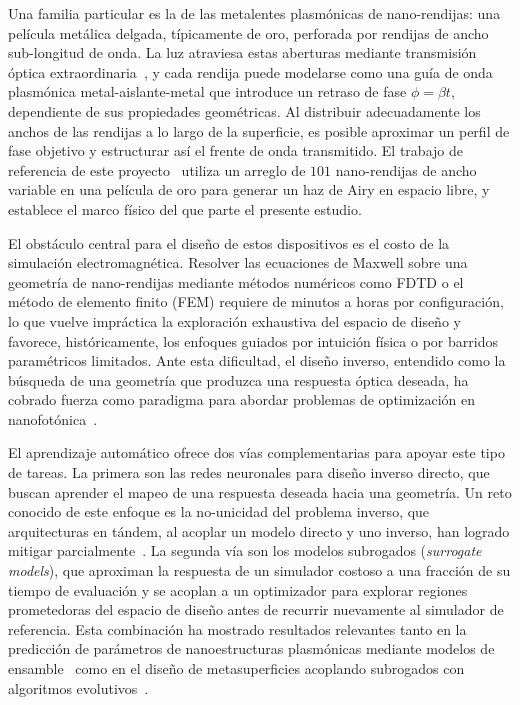 Una familia particular es la de las metalentes plasmónicas de nano-rendijas: una película metálica delgada, típicamente de oro, perforada por rendijas de ancho sub-longitud de onda. La luz atraviesa estas aberturas mediante transmisión óptica extraordinaria~\cite{ebbesen1998eot}, y cada rendija puede modelarse como una guía de onda plasmónica metal-aislante-metal que introduce un retraso de fase $\phi = \beta t$, dependiente de sus propiedades geométricas. Al distribuir adecuadamente los anchos de las rendijas a lo largo de la superficie, es posible aproximar un perfil de fase objetivo y estructurar así el frente de onda transmitido. El trabajo de referencia de este proyecto~\cite{airy_metalens} utiliza un arreglo de $101$ nano-rendijas de ancho variable en una película de oro para generar un haz de Airy en espacio libre, y establece el marco físico del que parte el presente estudio.

El obstáculo central para el diseño de estos dispositivos es el costo de la simulación electromagnética. Resolver las ecuaciones de Maxwell sobre una geometría de nano-rendijas mediante métodos numéricos como FDTD o el método de elemento finito (FEM) requiere de minutos a horas por configuración, lo que vuelve impráctica la exploración exhaustiva del espacio de diseño y favorece, históricamente, los enfoques guiados por intuición física o por barridos paramétricos limitados. Ante esta dificultad, el diseño inverso, entendido como la búsqueda de una geometría que produzca una respuesta óptica deseada, ha cobrado fuerza como paradigma para abordar problemas de optimización en nanofotónica~\cite{molesky2018inverse}.

El aprendizaje automático ofrece dos vías complementarias para apoyar este tipo de tareas. La primera son las redes neuronales para diseño inverso directo, que buscan aprender el mapeo de una respuesta deseada hacia una geometría. Un reto conocido de este enfoque es la no-unicidad del problema inverso, que arquitecturas en tándem, al acoplar un modelo directo y uno inverso, han logrado mitigar parcialmente~\cite{liu2018tandem}. La segunda vía son los modelos subrogados (\textit{surrogate models}), que aproximan la respuesta de un simulador costoso a una fracción de su tiempo de evaluación y se acoplan a un optimizador para explorar regiones prometedoras del espacio de diseño antes de recurrir nuevamente al simulador de referencia. Esta combinación ha mostrado resultados relevantes tanto en la predicción de parámetros de nanoestructuras plasmónicas mediante modelos de ensamble~\cite{maia2025inverse} como en el diseño de metasuperficies acoplando subrogados con algoritmos evolutivos~\cite{gao2025surrogate}.


